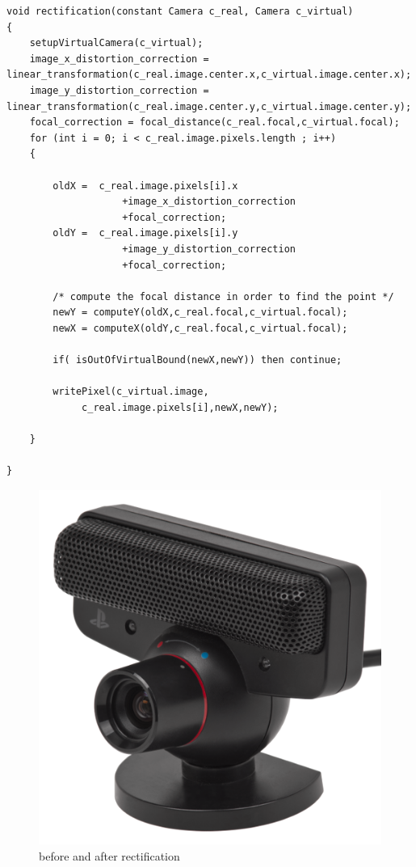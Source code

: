 \vspace{1cm}
\begin{lstlisting}
void rectification(constant Camera c_real, Camera c_virtual)
{
    setupVirtualCamera(c_virtual);
    image_x_distortion_correction = linear_transformation(c_real.image.center.x,c_virtual.image.center.x);
    image_y_distortion_correction = linear_transformation(c_real.image.center.y,c_virtual.image.center.y);
    focal_correction = focal_distance(c_real.focal,c_virtual.focal);
    for (int i = 0; i < c_real.image.pixels.length ; i++)
    {
		
		oldX =  c_real.image.pixels[i].x
		            +image_x_distortion_correction
		            +focal_correction;
		oldY =  c_real.image.pixels[i].y
		            +image_y_distortion_correction
		            +focal_correction;
		
		/* compute the focal distance in order to find the point */
		newY = computeY(oldX,c_real.focal,c_virtual.focal);
		newX = computeX(oldY,c_real.focal,c_virtual.focal);
		
		if( isOutOfVirtualBound(newX,newY)) then continue;
		
		writePixel(c_virtual.image,
		     c_real.image.pixels[i],newX,newY);
		     
    }

}
\end{lstlisting}

\begin{figure}[hbt] 
    \centering
    \caption{before and after rectification}
    \includegraphics{img/pseye.png}
\end{figure}




 
